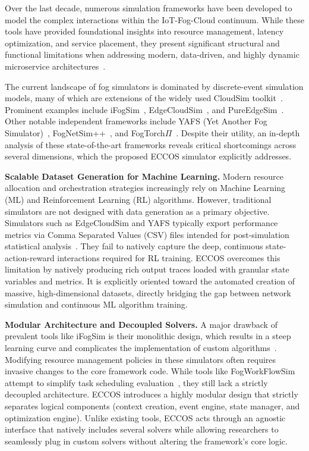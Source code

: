 \documentclass[ASNA]{USG} %
\begin{document}
Over the last decade, numerous simulation frameworks have been developed to model the complex interactions within the IoT-Fog-Cloud continuum. While these tools have provided foundational insights into resource management, latency optimization, and service placement, they present significant structural and functional limitations when addressing modern, data-driven, and highly dynamic microservice architectures~\cite{patel2022fog}.

The current landscape of fog simulators is dominated by discrete-event simulation models, many of which are extensions of the widely used CloudSim toolkit~\cite{5192685}. Prominent examples include iFogSim~\cite{https://doi.org/10.1002/spe.2509}, EdgeCloudSim~\cite{https://doi.org/10.1002/ett.3493}, and PureEdgeSim~\cite{Mechalikh2020PureEdgeSim}. Other notable independent frameworks include YAFS (Yet Another Fog Simulator)~\cite{8758823}, FogNetSim++~\cite{8502760}, and FogTorch$\Pi$~\cite{fogtorch}. Despite their utility, an in-depth analysis of these state-of-the-art frameworks reveals critical shortcomings across several dimensions, which the proposed ECCOS simulator explicitly addresses.

\textbf{Scalable Dataset Generation for Machine Learning.} Modern resource allocation and orchestration strategies increasingly rely on Machine Learning (ML) and Reinforcement Learning (RL) algorithms. However, traditional simulators are not designed with data generation as a primary objective. Simulators such as EdgeCloudSim and YAFS typically export performance metrics via Comma Separated Values (CSV) files intended for post-simulation statistical analysis~\cite{GILL2021100391}. They fail to natively capture the deep, continuous state-action-reward interactions required for RL training. ECCOS overcomes this limitation by natively producing rich output traces loaded with granular state variables and metrics. It is explicitly oriented toward the automated creation of massive, high-dimensional datasets, directly bridging the gap between network simulation and continuous ML algorithm training.

\textbf{Modular Architecture and Decoupled Solvers.} A major drawback of prevalent tools like iFogSim is their monolithic design, which results in a steep learning curve and complicates the implementation of custom algorithms~\cite{MARKUS2020102042}. Modifying resource management policies in these simulators often requires invasive changes to the core framework code. While tools like FogWorkFlowSim attempt to simplify task scheduling evaluation~\cite{fi12050089}, they still lack a strictly decoupled architecture. ECCOS introduces a highly modular design that strictly separates logical components (context creation, event engine, state manager, and optimization engine). Unlike existing tools, ECCOS acts through an agnostic interface that natively includes several solvers while allowing researchers to seamlessly plug in custom solvers without altering the framework's core logic.
\end{document}
